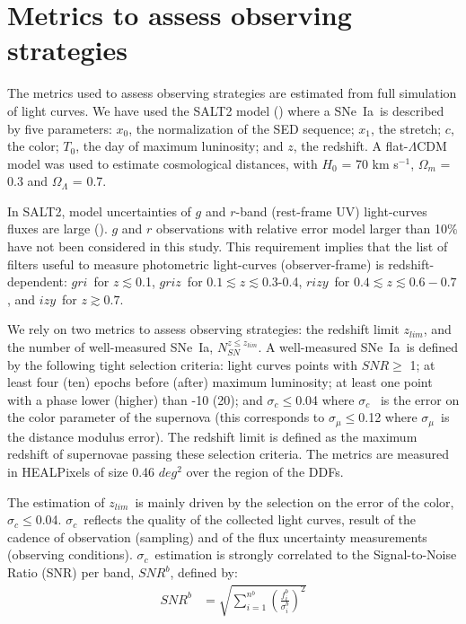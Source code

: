 \documentclass[skiphelvet,twocolumn]{aastex63}
\newcommand{\snrb}{\mbox{$SNR^b$}}
\newcommand{\bg}{{$g$}}
\newcommand{\br}{{$r$}}
\newcommand{\bi}{{$i$}}
\newcommand{\bz}{{$z$}}
\newcommand{\by}{{$y$}}
\newcommand{\snstrech}{\mbox{$x_1$}}
\newcommand{\daymax}{$T_0$}
\newcommand{\sigc}{\mbox{$\sigma_c$}}
\newcommand{\sigmu}{\mbox{$\sigma_\mu$}}
\newcommand{\zlim}{\mbox{$z_{lim}$}}
\newcommand{\sne}{{SNe~Ia}}
\newcommand{\nsn}{{$N_{SN}^{z\leq z_{lim}}$}}
\newcommand{\snx}{\mbox{$x_0$}}
\newcommand{\sncolor}{\mbox{$c$}}
\begin{document}
\section{Metrics to assess observing strategies}
\label{sec:metrics}
The metrics used to assess observing strategies are estimated from full simulation of light curves. We have used the SALT2 model (\citealt{Guy_2007,Guy_2010}) where a \sne~is described by five parameters: \snx, the normalization of the SED sequence; \snstrech, the stretch; \sncolor, the color; \daymax, the day of maximum luninosity; and $z$, the redshift. A flat-$\Lambda$CDM model was used to estimate cosmological distances, with $H_0$ = 70 km s$^{-1}$, $\Omega_m$ = 0.3 and $\Omega_\Lambda$ = 0.7.
\par
In SALT2, model uncertainties of $g$ and $r$-band (rest-frame UV) light-curves fluxes are large (\citealt{Guy_2007}). $g$ and $r$ observations with relative error model larger than 10$\%$ have not been considered in this study. This requirement implies that the list of filters useful to measure photometric light-curves (observer-frame) is redshift-dependent: \bg\br\bi~for $z\lesssim$0.1,  \bg\br\bi\bz~for $0.1\lesssim z\lesssim$0.3-0.4, \br\bi\bz\by~for $0.4\lesssim z \lesssim 0.6-0.7$, and \bi\bz\by~for $z\gtrsim 0.7$.
\par
We rely on two metrics to assess observing strategies: the redshift limit \zlim, and the number of well-measured \sne, \nsn. A well-measured \sne~is defined by the following tight selection criteria: light curves points with $SNR\geq$ 1; at least four (ten) epochs before (after) maximum luminosity; at least one point with a phase lower (higher) than -10 (20); and \sigc$\leq$0.04 where \sigc~ is the error on the color parameter of the supernova (this corresponds to \sigmu$\leq$0.12 where \sigmu~is the distance modulus error). The redshift limit is defined as the maximum redshift of supernovae passing these selection criteria. The metrics are measured in HEALPixels of size 0.46 $deg^2$ over the region of the DDFs.
\par
The estimation of \zlim~is mainly driven by the selection on the error of the color, \sigc$\leq$0.04. \sigc~reflects the quality of the collected light curves, result of the cadence of observation (sampling) and of the flux uncertainty measurements (observing conditions). \sigc~estimation is strongly correlated to the Signal-to-Noise Ratio (SNR) per band, \snrb,  defined by:
\begin{equation}
  \begin{aligned}
    SNR^b &= \sqrt{\sum_{i=1}^{n^b}{\left(\frac{f_i^b}{\sigma_i^b}\right)^2}}
    \end{aligned}
  \label{eq:snrb}
\end{equation}
\end{document}
